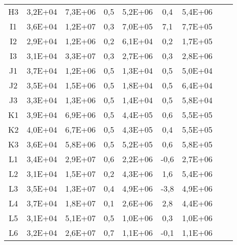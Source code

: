 \begin{center}
\begin{longtable}{ccccccccc}
H3    & 3,2E+04 & 7,3E+06 & 0,5   & 5,2E+06 & 0,4   & 5,4E+06 \\
I1    & 3,6E+04 & 1,2E+07 & 0,3   & 7,0E+05 & 7,1   & 7,7E+05 \\
I2    & 2,9E+04 & 1,2E+06 & 0,2   & 6,1E+04 & 0,2   & 1,7E+05 \\
I3    & 3,1E+04 & 3,3E+07 & 0,3   & 2,7E+06 & 0,3   & 2,8E+06 \\
J1    & 3,7E+04 & 1,2E+06 & 0,5   & 1,3E+04 & 0,5   & 5,0E+04 \\
J2    & 3,5E+04 & 1,5E+06 & 0,5   & 1,8E+04 & 0,5   & 6,4E+04 \\
J3    & 3,3E+04 & 1,3E+06 & 0,5   & 1,4E+04 & 0,5   & 5,8E+04 \\
K1    & 3,9E+04 & 6,9E+06 & 0,5   & 4,4E+05 & 0,6   & 5,5E+05 \\
K2    & 4,0E+04 & 6,7E+06 & 0,5   & 4,3E+05 & 0,4   & 5,5E+05 \\
K3    & 3,6E+04 & 5,8E+06 & 0,5   & 5,2E+05 & 0,6   & 5,8E+05 \\
L1    & 3,4E+04 & 2,9E+07 & 0,6   & 2,2E+06 & -0,6  & 2,7E+06 \\
L2    & 3,1E+04 & 1,5E+07 & 0,2   & 4,3E+06 & 1,6   & 5,4E+06 \\
L3    & 3,5E+04 & 1,3E+07 & 0,4   & 4,9E+06 & -3,8  & 4,9E+06 \\
L4    & 3,7E+04 & 1,8E+07 & 0,1   & 2,6E+06 & 2,8   & 4,4E+06 \\
L5    & 3,1E+04 & 5,1E+07 & 0,5   & 1,0E+06 & 0,3   & 1,0E+06 \\
L6    & 3,2E+04 & 2,6E+07 & 0,7   & 1,1E+06 & -0,1  & 1,1E+06 \\
\end{longtable}
\end{center}

